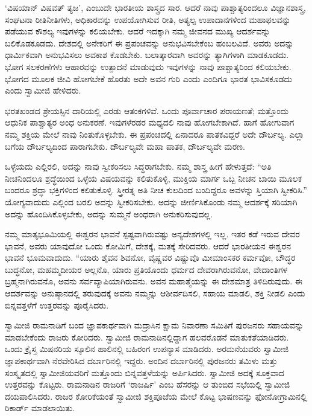  ‘ವಿಷಯಾನ್ ವಿಷವತ್ ತ್ಯಜ’, ಎಂಬುದೇ ಭಾರತೀಯ ಶಾಸ್ತ್ರದ ಸಾರ. ಆದರೆ ನಾವು ಪಾಶ್ಚಾತ್ಯರಿಂದಲೂ ವಿಜ್ಞಾನಶಾಸ್ತ್ರ, ಸಂಘಟನಾ ರೀತಿನೀತಿಗಳು, ಅಧಿಕಾರವನ್ನು ಉಪಯೋಗಿಸುವ ರೀತಿ, ಅತ್ಯಲ್ಪ ಉಪಾದಾನಗಳಿಂದ ಮಹಾಫಲವನ್ನು ಪಡೆಯುವ ಕೌಶಲ್ಯ ಇವುಗಳನ್ನು ಕಲಿಯಬೇಕು. ಆದರೆ ಇದಕ್ಕಾಗಿ ನಮ್ಮ ಜೀವನದ ಮುಖ್ಯ ಆದರ್ಶವನ್ನು ಬಲಿಕೊಡಕೂಡದು. ದೇಶದಲ್ಲಿ ಅನೇಕರಿಗೆ ಈ ಪ್ರಪಂಚವನ್ನು ಅನುಭವಿಸಬೇಕೆಂಬ ಹಂಬಲವಿದೆ. ಅವರು ಅದನ್ನು ಧಾರ್ಮಿಕವಾಗಿ ಅನುಭವಿಸಲು ಅವಕಾಶ ಕೊಡಬೇಕು. ಬಲಾತ್ಕಾರವಾಗಿ ಅವರನ್ನು ತ್ಯಾಗಿಗಳಾಗಿ ಮಾಡಕೂಡದು. ಭೋಗ ಸಲಕರಣೆಗಳು ಆಹಾರವನ್ನು ಉತ್ಪಾದನೆ ಮಾಡುವುದು ಇವುಗಳನ್ನು ನಾವು ಪಾಶ್ಚಾತ್ಯರಿಂದ ಕಲಿಯಬೇಕು. ಭೋಗದ ಮೂಲಕ ಜೀವಿ ಹೋಗಬೇಕೆ ಹೊರತು ಅದೇ ಅವನ ಗುರಿ ಎಂದು ಎಂದಿಗೂ ಭಾರತ ಭಾವಿಸಕೂಡದು ಎಂದು ಸ್ವಾಮೀಜಿ ಹೇಳಿದರು. 

 ಭರತಖಂಡದ ಶ್ರೇಯಸ್ಸಿನ ದಾರಿಯಲ್ಲಿ ಎರಡು ಆತಂಕಗಳಿವೆ. ಒಂದು ಪೂರ್ವಾಚಾರ ಪರಾಯಣತೆ; ಮತ್ತೊಂದು ಆಧುನಿಕ ಪಾಶ್ಚಾತ್ಯರ ಅಂಧ ಅನುಕರಣೆ. ಇವುಗಳೆರಡರ ಮಧ್ಯದಲಿ ನಾವು ಹೋಗಬೇಕಾಗಿದೆ. ಹಾಗೆ ಹೋಗುವಾಗ ನಮ್ಮ ಶಕ್ತಿಯ ಮೇಲೆ ನಾವು ನಿಂತುಕೊಳ್ಳಬೇಕು. ಈ ಪ್ರಪಂಚದಲ್ಲಿ ಏನಾದರೂ ಪಾತಕವಿದ್ದರೆ ಅದೇ ದೌರ್ಬಲ್ಯ. ಎಲ್ಲಾ ಬಗೆಯ ದೌರ್ಬಲ್ಯದಿಂದ ಪಾರಾಗಬೇಕು. ದೌರ್ಬಲ್ಯವೇ ಮಹಾ ಪಾತಕ, ದೌರ್ಬಲ್ಯವೇ ಮರಣ. 

 ಒಳ್ಳೆಯದು ಎಲ್ಲಿರಲಿ, ಅದನ್ನು ನಾವು ಸ್ವೀಕರಿಸಲು ಸಿದ್ಧರಾಗಬೇಕು. ನಮ್ಮ ಶಾಸ್ತ್ರ ಹೀಗೆ ಹೇಳುತ್ತದೆ: “ಅತಿ ನೀಚನಿಂದಲೂ ಶ್ರದ್ಧೆಯಿಂದ ಒಳ್ಳೆಯ ವಿಷಯವನ್ನು ಕಲಿತುಕೊಳ್ಳಿ, ಮುಕ್ತಿಯ ಮಾರ್ಗ ಒಬ್ಬ ನೀಚನ ಬಾಯಿ ಮೂಲಕ ಬಂದರೂ ಶ್ರದ್ಧಾ ಭಕ್ತಿಗಳಿಂದ ಕಲಿತುಕೊಳ್ಳಿ. ಸ್ತ್ರೀರತ್ನ ಅತಿ ನೀಚ ಕುಲದಿಂದ ಬಂದಿದ್ದರೂ ಅವಳನ್ನು ಸ್ತಿಯಾಗಿ ಸ್ವೀಕರಿಸಿ.” ಯೋಗ್ಯವಾದುದು ಎಲ್ಲಿಂದ ಬರಲಿ ಅದನ್ನು ಸ್ವೀಕರಿಸಬೇಕು. ಅದನ್ನು ಜೀರ್ಣಿಸಿಕೊಂಡು ನಮ್ಮ ಆದರ್ಶಕ್ಕೆ ಸರಿಯಾಗಿ ಅದನ್ನು ಹೊಂದಿಸಿಕೊಳ್ಳಬೇಕು, ಅದನ್ನು ಸುಮ್ಮನೆ ಅಂಧರಾಗಿ ಅನುಕರಿಸುವುದಲ್ಲ. 

 ನಮ್ಮ ಮಾತೃಭೂಮಿಯಲ್ಲಿ ಈಶ್ವರನ ಭಾವನೆ ಸ್ಪಷ್ಟವಾಗಿರುವಷ್ಟು ಅನ್ಯದೇಶಗಳಲ್ಲಿ ಇಲ್ಲ. ಇತರ ಕಡೆ ಇರುವ ದೇವರ ಭಾವನೆ, ಅವರು ಯಾವುದೋ ಒಂದು ಕೋಮಿಗೆ, ದೇಶಕ್ಕೆ, ಮತಕ್ಕೆ ಸೇರಿದವರು. ಆದರೆ ಭಾರತೀಯನ ಈಶ್ವರನ ಭಾವನೆ ಭೂಮವಾದುದು. “ಯಾರು ಶೈವನ ಶಿವನೋ, ವೈಷ್ಣವರ ವಿಷ್ಣುವೊ ಮೀಮಾಂಸಕರ ಕರ್ಮವೋ, ಬೌದ್ಧರ ಬುದ್ಧನೋ, ಮಹಮ್ಮದೀಯರ ಅಲ್ಲನೊ, ಯಾರು ಪ್ರತಿಯೊಂದು ಧರ್ಮದ ದೇವರಾಗಿರುವನೋ, ವೇದಾಂತಿಗಳ ಬ್ರಹ್ಮನಾಗಿರುವನೊ, ಅವನು ಸರ್ವವ್ಯಾಪಿಯಾಗಿರುವನು. ಅವನ ಮಹಾತ್ಮೆಯನ್ನು ಈ ದೇಶಮಾತ್ರ ತಿಳಿದಿರುವುದು. ಈ ಆದರ್ಶವನ್ನು ಅನುಷ್ಠಾನದಲ್ಲಿ ತರುವುದಕ್ಕೆ ಅವನು ನಮ್ಮನ್ನು ಆಶೀರ್ವದಿಸಲಿ, ಸಹಾಯ ಮಾಡಲಿ, ಶಕ್ತಿ ನೀಡಲಿ ಎಂದು ಬಿನ್ನವತ್ತಳೆಗೆ ಉತ್ತರವನ್ನು ಪೂರೈಸಿದರು. 

 ಸ್ವಾಮೀಜಿ ರಾಮನಾಡಿಗೆ ಬಂದ ಜ್ಞಾಪಕಾರ್ಥವಾಗಿ ಮದ್ರಾಸಿನ ಕ್ಷಾಮ ನಿವಾರಣಾ ಸಮಿತಿಗೆ ಪುರಜನರು ಸಹಾಯವನ್ನು ಮಾಡಬೇಕೆಂದು ರಾಜರು ಕೋರಿದರು. ಸ್ವಾಮೀಜಿ ರಾಮನಾಡಿನಲ್ಲಿದ್ದಾಗ ಹಲವರೊಡನೆ ಮಾತುಕತೆಯಾಡಿದರು. ಒಂದು ಕ್ರೈಸ್ತ ಮಿಷನರಿಯ ಸ್ಕೂಲಿನ ಹಾಲಿನಲ್ಲಿ ಬಹಿರಂಗ ಉಪನ್ಯಾಸ ಮಾಡಿದರು. ಅರಮನೆಯವರು ಸ್ವಾಮೀಜಿ ಜ್ಞಾಪಕಾರ್ಥವಾಗಿ ನೆರವೇರಿಸಿದ ದರ್ಬಾರಿನಲ್ಲಿ ಇದ್ದರು. ಅಂದಿನ ದರ್ಬಾರಿನಲ್ಲಿ ಪುರಜನರು ತಮಿಳು ಮತ್ತು ಸಂಸ್ಕೃತದಲ್ಲಿ ಸ್ವಾಮೀಜಿಯವರಿಗೆ ಮತ್ತೊಂದು ಬಿನ್ನವತ್ತಳೆಯನ್ನು ಅರ್ಪಿಸಿದರು. ಸ್ವಾಮೀಜಿ ಅದಕ್ಕೆ ಸೂಕ್ತವಾದ ಉತ್ತರವನ್ನು ಕೊಟ್ಟರು. ರಾಮನಾಡಿನ ರಾಜರಿಗೆ ‘ರಾಜರ್ಷಿ’ ಎಂಬ ಹೆಸರನ್ನು ಆ ತುಂಬಿದ ಸಭೆಯಲ್ಲಿ ಸ್ವಾಮೀಜಿ ದಯಪಾಲಿಸಿದರು. ರಾಜರ ಕೋರಿಕೆಯಂತೆ ಸ್ವಾಮೀಜಿ ಶಕ್ತಿಪೂಜೆಯ ಮೇಲೆ ಕೊಟ್ಟ ಭಾಷಣವನ್ನು ಫೋನೋಗ್ರಾಮಿನಲ್ಲಿ ರಿಕಾರ್ಡ್ ಮಾಡಲಾಯಿತು. 

